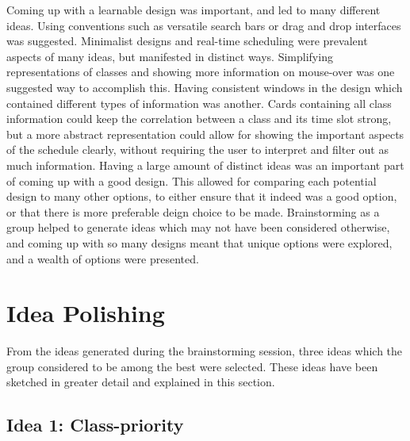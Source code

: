 \documentclass{article}
\begin{document}
\newline
Coming up with a learnable design was important, and led to many different ideas. Using conventions such as versatile search bars or drag and drop interfaces was suggested. Minimalist designs and real-time scheduling were prevalent aspects of many ideas, but manifested in distinct ways. Simplifying representations of classes and showing more information on mouse-over was one suggested way to accomplish this. Having consistent windows in the design which contained different types of information was another. Cards containing all class information could keep the correlation between a class and its time slot strong, but a more abstract representation could allow for showing the important aspects of the schedule clearly, without requiring the user to interpret and filter out as much information.
\newline
\newline
Having a large amount of distinct ideas was an important part of coming up with a good design. This allowed for comparing each potential design to many other options, to either ensure that it indeed was a good option, or that there is more preferable deign choice to be made. Brainstorming as a group helped to generate ideas which may not have been considered otherwise, and coming up with so many designs meant that unique options were explored, and a wealth of options were presented.



\section{Idea Polishing}
From the ideas generated during the brainstorming session, three ideas which the group considered to be among the best were selected. These ideas have been sketched in greater detail and explained in this section.
\subsection{Idea 1: Class-priority}%
\end{document}
